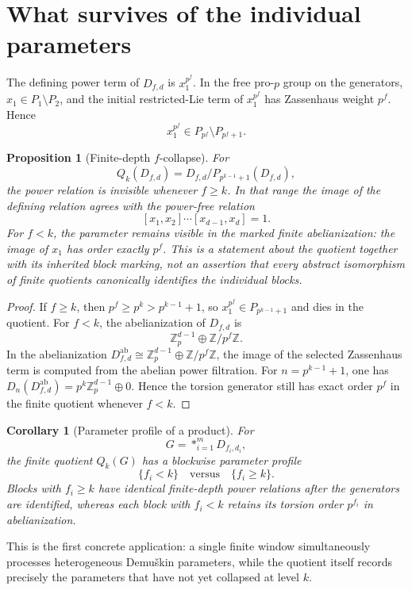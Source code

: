 \documentclass[11pt]{article}
\newtheorem{proposition}[theorem]{Proposition}
\newtheorem{corollary}[theorem]{Corollary}
\begin{document}
\section{What survives of the individual parameters}

The defining power term of $D_{f,d}$ is
$x_1^{p^f}$. In the free pro-$p$ group on the generators,
$x_1\in P_1\setminus P_2$, and the initial restricted-Lie term of
$x_1^{p^f}$ has Zassenhaus weight $p^f$. Hence
\[
x_1^{p^f}\in P_{p^f}\setminus P_{p^f+1}.
\]

\begin{proposition}[Finite-depth $f$-collapse]
For
\[
Q_k(D_{f,d})=D_{f,d}/P_{p^{k-1}+1}(D_{f,d}),
\]
the power relation is invisible whenever $f\ge k$. In that range the image of the defining relation agrees with the power-free relation
\[
[x_1,x_2]\cdots[x_{d-1},x_d]=1.
\]
For $f<k$, the parameter remains visible in the marked finite abelianization: the image of $x_1$ has order exactly $p^f$. This is a statement about the quotient together with its inherited block marking, not an assertion that every abstract isomorphism of finite quotients canonically identifies the individual blocks.
\end{proposition}

\begin{proof}
If $f\ge k$, then
$p^f\ge p^k>p^{k-1}+1$, so
$x_1^{p^f}\in P_{p^{k-1}+1}$ and dies in the quotient.
For $f<k$, the abelianization of $D_{f,d}$ is
\[
\mathbb Z_p^{d-1}\oplus\mathbb Z/p^f\mathbb Z.
\]
In the abelianization $D_{f,d}^{\mathrm{ab}}\cong\mathbb Z_p^{d-1}\oplus\mathbb Z/p^f\mathbb Z$, the image of the selected Zassenhaus term is computed from the abelian power filtration. For $n=p^{k-1}+1$, one has $D_n(D_{f,d}^{\mathrm{ab}})=p^k\mathbb Z_p^{d-1}\oplus0$. Hence the torsion generator still has exact order $p^f$ in the finite quotient whenever $f<k$.
\end{proof}

\begin{corollary}[Parameter profile of a product]
For
\[
G=*_{i=1}^mD_{f_i,d_i},
\]
the finite quotient $Q_k(G)$ has a blockwise parameter profile
\[
\{f_i<k\}\quad\text{versus}\quad\{f_i\ge k\}.
\]
Blocks with $f_i\ge k$ have identical finite-depth power relations after the generators are identified, whereas each block with $f_i<k$ retains its torsion order $p^{f_i}$ in abelianization.
\end{corollary}

This is the first concrete application: a single finite window simultaneously processes heterogeneous Demuškin parameters, while the quotient itself records precisely the parameters that have not yet collapsed at level $k$.
\end{document}
